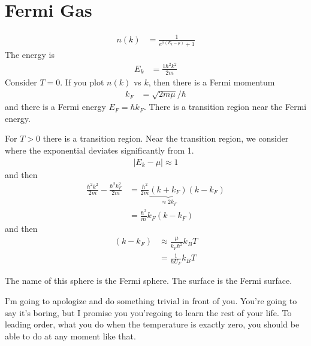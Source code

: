 \section{Fermi Gas}
\begin{align}
    n(k) &=
    \frac{1}{e^{\beta\left( E_k - \mu \right)} + 1}
\end{align}
The energy is
\begin{align}
    E_k &=
    \frac{1\hbar^2 k^2}{2m}
\end{align}
Consider $T=0$.
If you plot $n(k)$ vs $k$,
then there is a Fermi momentum
\begin{align}
    k_F &=
    \sqrt{2m \mu}/\hbar
\end{align}
and there is a Fermi energy $E_F = \hbar k_F$.
There is a transition region near the Fermi energy.

For $T>0$ there is a transition region.
Near the transition region,
we consider where the exponential deviates significantly from 1.
\begin{align}
    \left|E_k - \mu\right| \approx 1
\end{align}
and then
\begin{align}
    \frac{\hbar^2 k^2}{2m}
    -
    \frac{\hbar^2 k_F^2}{2m}
    &=
    \frac{\hbar^2}{2m}
    \underbrace{
    \left( k + k_F \right)
    }_{\approx 2k_F}
    \left( k - k_F \right)\\
    &=
    \frac{\hbar^2}{m}k_F (k - k_F)
\end{align}
and then
\begin{align}
    \left( k - k_F \right)
    &\approx
    \frac{\mu}{k_F \hbar^2} k_B T\\
    &=
    \frac{1}{\hbar U_F} k_B T
\end{align}

The name of this sphere is the Fermi sphere.
The surface is the Fermi surface.

I'm going to apologize and do something trivial in front of you.
You're going to say it's boring,
but I promise you you'regoing to learn the rest of your life.
To leading order,
what you do when the temperature is exactly zero,
you should be able to do at any moment like that.

